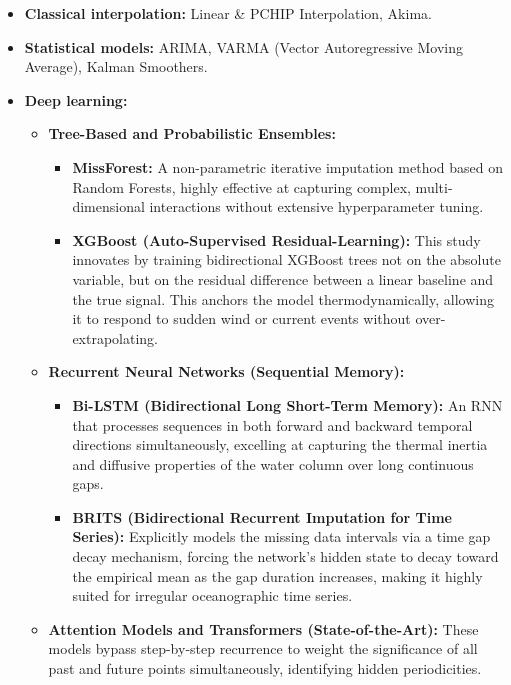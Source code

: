 \documentclass[12pt,a4paper]{article}
\begin{document}
\begin{itemize}[noitemsep]
    \item \textbf{Classical interpolation:} Linear \& PCHIP Interpolation, Akima.
    \item \textbf{Statistical models:} ARIMA, VARMA (Vector Autoregressive Moving Average), Kalman Smoothers.
    \item \textbf{Deep learning:}
    \begin{itemize}
        \item \textbf{Tree-Based and Probabilistic Ensembles:} 
        \begin{itemize}
            \item \textbf{MissForest:} A non-parametric iterative imputation method based on Random Forests, highly effective at capturing complex, multi-dimensional interactions without extensive hyperparameter tuning.
            \item \textbf{XGBoost (Auto-Supervised Residual-Learning):} This study innovates by training bidirectional XGBoost trees not on the absolute variable, but on the residual difference between a linear baseline and the true signal. This anchors the model thermodynamically, allowing it to respond to sudden wind or current events without over-extrapolating.
        \end{itemize}
        \item \textbf{Recurrent Neural Networks (Sequential Memory):}
        \begin{itemize}
            \item \textbf{Bi-LSTM (Bidirectional Long Short-Term Memory):} An RNN that processes sequences in both forward and backward temporal directions simultaneously, excelling at capturing the thermal inertia and diffusive properties of the water column over long continuous gaps.
            \item \textbf{BRITS (Bidirectional Recurrent Imputation for Time Series):} Explicitly models the missing data intervals via a time gap decay mechanism, forcing the network's hidden state to decay toward the empirical mean as the gap duration increases, making it highly suited for irregular oceanographic time series.
        \end{itemize}
        \item \textbf{Attention Models and Transformers (State-of-the-Art):} These models bypass step-by-step recurrence to weight the significance of all past and future points simultaneously, identifying hidden periodicities.
        \begin{itemize}

\end{itemize}
\end{itemize}
\end{itemize}
\end{document}
